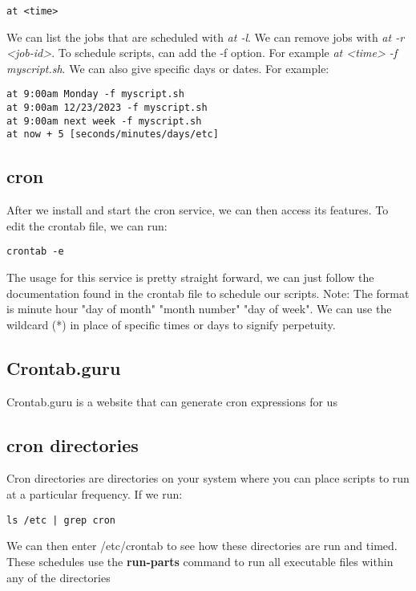 \documentclass{report}
\begin{document}
    \begin{verbatim}
at <time>
    \end{verbatim}
    \bigbreak \noindent
    
    \bigbreak \noindent 
    We can list the jobs that are scheduled with \textit{at -l}. We can remove jobs with \textit{at -r <job-id>}. To schedule scripts, can add the -f option. For example \textit{at <time> -f myscript.sh}. 
    \bigbreak \noindent 
    We can also give specific days or dates. For example:
    \begin{verbatim}
at 9:00am Monday -f myscript.sh
at 9:00am 12/23/2023 -f myscript.sh
at 9:00am next week -f myscript.sh
at now + 5 [seconds/minutes/days/etc]
    \end{verbatim}
    \bigbreak \noindent
    
    \pagebreak \bigbreak \noindent 
    \subsection{cron}
    \bigbreak \noindent 
    After we install and start the cron service, we can then access its features. To edit the crontab file, we can run:
    \begin{verbatim}
crontab -e
    \end{verbatim}
    \bigbreak \noindent 
    The usage for this service is pretty straight forward, we can just follow the documentation found in the crontab file to schedule our scripts.
    \bigbreak \noindent 
    Note: The format is minute hour "day of month" "month number" "day of week". We can use the wildcard (*) in place of specific times or days to signify perpetuity.

    \bigbreak \noindent 
    \subsection{Crontab.guru}
    \bigbreak \noindent 
    Crontab.guru is a website that can generate cron expressions for us

    \bigbreak \noindent 
    \subsection{cron directories}
    \bigbreak \noindent 
    \begin{concept}
        Cron directories are directories on your system where you can place scripts to run at a particular frequency. If we run:
    \end{concept}
    \bigbreak \noindent 
    \begin{verbatim}
ls /etc | grep cron
    \end{verbatim}
    \bigbreak \noindent
    We can then enter /etc/crontab to see how these directories are run and timed. These schedules use the \textbf{run-parts} command to run all executable files within any of the directories 
\end{document}
